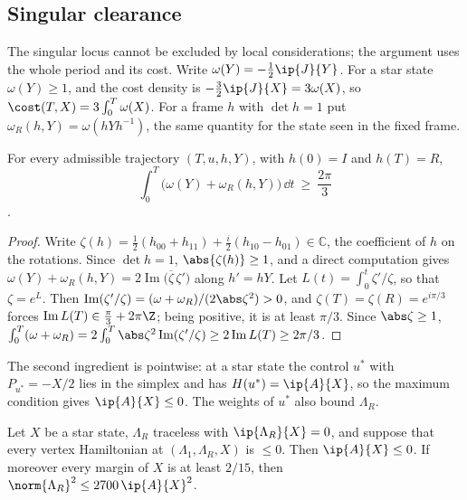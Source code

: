 \subsection{Singular clearance}\label{red:clearance-sec}

The singular locus cannot be excluded by local considerations; the argument uses the whole
period and its cost. Write $\omega(Y)=-\frac12\ip{J}{Y}$. For a star state $\omega(Y)\ge1$, and
the cost density is $-\frac32\ip{J}{X}=3\omega(X)$, so $\cost(T,X)=3\int_0^T\omega(X)$. For a
frame $h$ with $\det h=1$ put $\omega_R(h,Y)=\omega(hYh^{-1})$, the same quantity for the state
seen in the fixed frame.

\begin{lemma}[Winding]\label{red:winding}
For every admissible trajectory $(T,u,h,Y)$, with $h(0)=I$ and $h(T)=R$,
\[
\int_0^T\bigl(\omega(Y)+\omega_R(h,Y)\bigr)\,\dd t\ \ge\ \frac{2\pi}3
\].
\end{lemma}

\begin{proof}
Write $\zeta(h)=\frac12(h_{00}+h_{11})+\frac i2(h_{10}-h_{01})\in\mathbb C$, the coefficient of
$h$ on the rotations. Since $\det h=1$, $\abs{\zeta(h)}\ge1$, and a direct computation gives
$\omega(Y)+\omega_R(h,Y)=2\operatorname{Im}\bigl(\overline{\zeta}\,\zeta'\bigr)$ along $h'=hY$. Let $L(t)=\int_0^t\zeta'/\zeta$, so that $\zeta=e^{L}$. Then
$\operatorname{Im}(\zeta'/\zeta)=(\omega+\omega_R)/(2\abs\zeta^2)>0$, and
$\zeta(T)=\zeta(R)=e^{i\pi/3}$ forces $\operatorname{Im}L(T)\in\frac\pi3+2\pi\Z$; being positive,
it is at least $\pi/3$. Since $\abs\zeta\ge1$,
$\int_0^T(\omega+\omega_R)=2\int_0^T\abs\zeta^2\operatorname{Im}(\zeta'/\zeta)
\ge2\operatorname{Im}L(T)\ge2\pi/3$.
\end{proof}

The second ingredient is pointwise: at a star state the control $u^*$ with $P_{u^*}=-X/2$ lies
in the simplex and has $H(u^*)=\ip{A}{X}$, so the maximum condition gives $\ip{A}{X}\le0$. The
weights of $u^*$ also bound $\Lambda_R$.

\begin{lemma}\label{red:equilibrium}
Let $X$ be a star state, $\Lambda_R$ traceless with $\ip{\Lambda_R}{X}=0$, and suppose that every
vertex Hamiltonian at $(\Lambda_1,\Lambda_R,X)$ is $\le0$. Then $\ip{A}{X}\le0$. If moreover every
margin of $X$ is at least $2/15$, then $\norm{\Lambda_R}^2\le2700\,\ip{A}{X}^2$.
\end{lemma}

